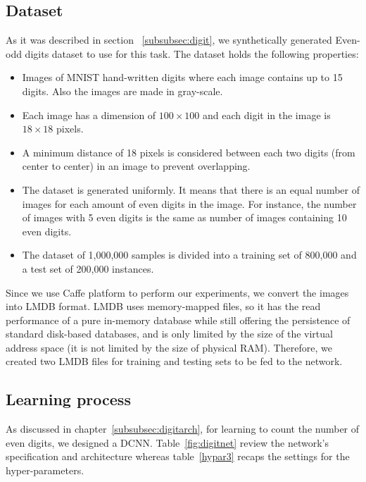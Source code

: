\subsection{Dataset} 
As it was described in section ~\ref{subsubsec:digit}, we synthetically generated Even-odd digits dataset to use for this task. The dataset holds the following properties:
\begin{itemize}
\item Images of MNIST hand-written digits where each image contains up to 15 digits. Also the images are made in gray-scale.
\item Each image has a dimension of $100\times100$ and each digit in the image is $18\times18$ pixels.  
\item A minimum distance of 18 pixels is considered between each two digits (from center to center) in an image to prevent overlapping.
\item The dataset is generated uniformly. It means that there is an equal number of images for each amount of even digits in the image. For instance, the number of images with 5 even digits is the same as number of images containing 10 even digits.
\item The dataset of 1,000,000 samples is divided into a training set of 800,000 and a test set of 200,000 instances. 
\end{itemize}

Since we use Caffe platform to perform our experiments, we convert the images into LMDB format. LMDB uses memory-mapped files, so it has the read performance of a pure in-memory database while still offering the persistence of standard disk-based databases, and is only limited by the size of the virtual address space (it is not limited by the size of physical RAM). Therefore, we created two LMDB files for training and testing sets to be fed to the network.  

\subsection{Learning process}

As discussed in chapter~\ref{subsubsec:digitarch}, for learning to count the number of even digits, we designed a DCNN. Table~\ref{fig:digitnet} review the network's specification and architecture whereas table~\ref{hypar3} recaps the settings for the hyper-parameters.



